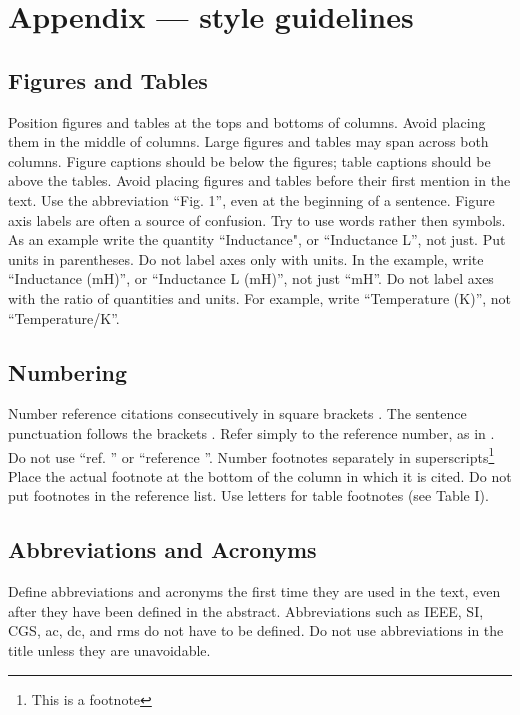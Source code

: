 \documentclass[letterpaper, 10 pt, conference]{ieeeconf}  %
\begin{document}
 
  

\section*{Appendix --- style guidelines}

\subsection{Figures and Tables}

Position figures and tables at the tops and bottoms of columns.
Avoid placing them in the middle of columns. Large figures and tables
may span across both columns. Figure captions should be below the figures;
 table captions should be above the tables. Avoid placing figures and tables
  before their first mention in the text. Use the abbreviation ``Fig. 1'',
  even at the beginning of a sentence.
Figure axis labels are often a source of confusion.
Try to use words rather then symbols. As an example write the quantity ``Inductance",
 or ``Inductance L'', not just.
 Put units in parentheses. Do not label axes only with units.
 In the example, write ``Inductance (mH)'', or ``Inductance L (mH)'', not just ``mH''.
 Do not label axes with the ratio of quantities and units.
 For example, write ``Temperature (K)'', not ``Temperature/K''.

\subsection{Numbering}

Number reference citations consecutively in square brackets \cite{Garcia.ea:Auto89}.
 The sentence punctuation follows the brackets \cite{Garcia.ea:Auto89}.
 Refer simply to the reference number, as in \cite{Garcia.ea:Auto89}.
 Do not use ``ref. \cite{Garcia.ea:Auto89}'' or ``reference \cite{Garcia.ea:Auto89}''.
Number footnotes separately in superscripts\footnote{This is a footnote}
Place the actual footnote at the bottom of the column in which it is cited.
Do not put footnotes in the reference list.
Use letters for table footnotes (see Table I).

\subsection{Abbreviations and Acronyms}

Define abbreviations and acronyms the first time they are used in the text,
even after they have been defined in the abstract. Abbreviations such as
IEEE, SI, CGS, ac, dc, and rms do not have to be defined. Do not use
abbreviations in the title unless they are unavoidable.
\end{document}
